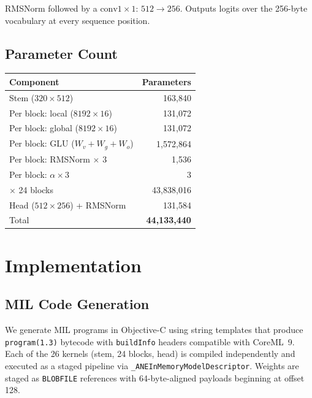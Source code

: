 \documentclass[10pt,twocolumn]{article}
\begin{document}
RMSNorm followed by a $\text{conv}1{\times}1$: $512 \to 256$.
Outputs logits over the 256-byte vocabulary at every sequence position.

\subsection{Parameter Count}

\begin{center}
\begin{tabular}{lr}
\toprule
Component & Parameters \\
\midrule
Stem ($320{\times}512$)            & 163,840 \\
Per block: local ($8192{\times}16$) & 131,072 \\
Per block: global ($8192{\times}16$) & 131,072 \\
Per block: GLU ($W_v + W_g + W_o$) & 1,572,864 \\
Per block: RMSNorm $\times$ 3      & 1,536 \\
Per block: $\alpha \times 3$       & 3 \\
$\times$ 24 blocks                 & 43,838,016 \\
Head ($512{\times}256$) + RMSNorm  & 131,584 \\
\midrule
Total                              & \textbf{44,133,440} \\
\bottomrule
\end{tabular}
\end{center}

\section{Implementation}
\label{sec:implementation}

\subsection{MIL Code Generation}

We generate MIL programs in Objective-C using string templates that produce
\texttt{program(1.3)} bytecode with \texttt{buildInfo} headers compatible
with CoreML~9.
Each of the 26 kernels (stem, 24 blocks, head) is compiled independently
and executed as a staged pipeline via
\texttt{\_ANEInMemoryModelDescriptor}.
Weights are staged as \texttt{BLOBFILE} references with 64-byte-aligned
payloads beginning at offset 128.
\end{document}
